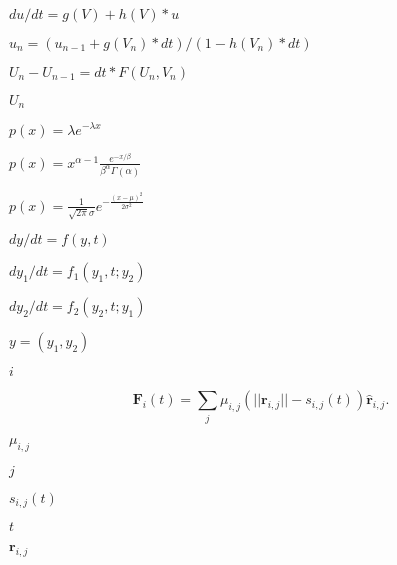 \documentclass{article}
\begin{document}
$du/dt = g(V) + h(V)*u$
\pagebreak

$u_n = ( u_{n-1} + g(V_n)*dt ) / ( 1 - h(V_n)*dt )$
\pagebreak

$U_n - U_{n-1} = dt*F(U_n, V_n)$
\pagebreak

$U_n$
\pagebreak

$\displaystyle p(x) = \lambda e^{-\lambda x}$
\pagebreak

$\displaystyle p(x) = x^{\alpha-1}\frac{e^{-x/\beta}}{\beta^\alpha\Gamma(\alpha)}$
\pagebreak

$\displaystyle p(x) =
  \frac{1}{\sqrt{2\pi}\sigma} e^{-\frac{(x-\mu)^2}{2\sigma^2}}
$
\pagebreak

$dy/dt = f(y, t)$
\pagebreak

$dy_1/dt = f_1(y_1, t; y_2)$
\pagebreak

$dy_2/dt = f_2(y_2, t; y_1)$
\pagebreak

$y = (y_1, y_2)$
\pagebreak

$i$
\pagebreak

\[
\mathbf{F}_{i}(t) = \sum_{j} \mu_{i,j} ( || \mathbf{r}_{i,j} || - s_{i,j}(t) ) \hat{\mathbf{r}}_{i,j}.
\]
\pagebreak

$\mu_{i,j}$
\pagebreak

$j$
\pagebreak

$s_{i,j}(t)$
\pagebreak

$t$
\pagebreak

$\mathbf{r}_{i,j}$
\pagebreak

$\hat{}$
\pagebreak
\end{document}

